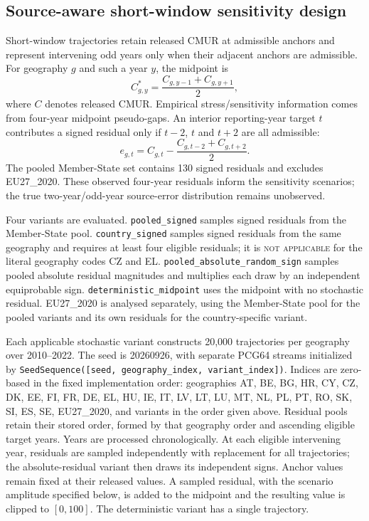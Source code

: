 \subsection{Source-aware short-window sensitivity design}

Short-window trajectories retain released CMUR at admissible anchors and represent intervening odd years only when their adjacent anchors are admissible. For geography $g$ and such a year $y$, the midpoint is
\begin{equation}
C^\ast_{g,y}=\frac{C_{g,y-1}+C_{g,y+1}}{2},
\end{equation}
where $C$ denotes released CMUR. Empirical stress/sensitivity information comes from four-year midpoint pseudo-gaps. An interior reporting-year target $t$ contributes a signed residual only if $t-2$, $t$ and $t+2$ are all admissible:
\begin{equation}
e_{g,t}=C_{g,t}-\frac{C_{g,t-2}+C_{g,t+2}}{2}.
\end{equation}
The pooled Member-State set contains 130 signed residuals and excludes EU27\_2020. These observed four-year residuals inform the sensitivity scenarios; the true two-year/odd-year source-error distribution remains unobserved.

Four variants are evaluated. \texttt{pooled\_signed} samples signed residuals from the Member-State pool. \texttt{country\_signed} samples signed residuals from the same geography and requires at least four eligible residuals; it is \textsc{not applicable} for the literal geography codes CZ and EL. \texttt{pooled\_absolute\_random\_sign} samples pooled absolute residual magnitudes and multiplies each draw by an independent equiprobable sign. \texttt{deterministic\_midpoint} uses the midpoint with no stochastic residual. EU27\_2020 is analysed separately, using the Member-State pool for the pooled variants and its own residuals for the country-specific variant.

Each applicable stochastic variant constructs 20,000 trajectories per geography over 2010--2022. The seed is 20260926, with separate PCG64 streams initialized by \texttt{SeedSequence([seed, geography\_index, variant\_index])}. Indices are zero-based in the fixed implementation order: geographies AT, BE, BG, HR, CY, CZ, DK, EE, FI, FR, DE, EL, HU, IE, IT, LV, LT, LU, MT, NL, PL, PT, RO, SK, SI, ES, SE, EU27\_2020, and variants in the order given above. Residual pools retain their stored order, formed by that geography order and ascending eligible target years. Years are processed chronologically. At each eligible intervening year, residuals are sampled independently with replacement for all trajectories; the absolute-residual variant then draws its independent signs. Anchor values remain fixed at their released values. A sampled residual, with the scenario amplitude specified below, is added to the midpoint and the resulting value is clipped to $[0,100]$. The deterministic variant has a single trajectory.

